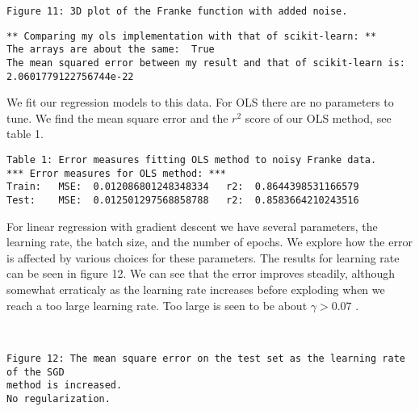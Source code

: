 \documentclass[11pt]{article}
\begin{document}
    \begin{Verbatim}[commandchars=\\\{\}]
Figure 11: 3D plot of the Franke function with added noise.
    \end{Verbatim}

    \begin{Verbatim}[commandchars=\\\{\}]
** Comparing my ols implementation with that of scikit-learn: **
The arrays are about the same:  True
The mean squared error between my result and that of scikit-learn is:
2.0601779122756744e-22
    \end{Verbatim}

    We fit our regression models to this data. For OLS there are no
parameters to tune. We find the mean square error and the \(r^2\) score
of our OLS method, see table 1.


    \begin{Verbatim}[commandchars=\\\{\}]
Table 1: Error measures fitting OLS method to noisy Franke data.
*** Error measures for OLS method: ***
Train:   MSE:  0.012086801248348334   r2:  0.8644398531166579
Test:    MSE:  0.012501297568858788   r2:  0.8583664210243516
    \end{Verbatim}

    For linear regression with gradient descent we have several parameters,
the learning rate, the batch size, and the number of epochs. We explore
how the error is affected by various choices for these parameters. The
results for learning rate can be seen in figure 12. We can see that the
error improves steadily, although somewhat erraticaly as the learning
rate increases before exploding when we reach a too large learning rate.
Too large is seen to be about \(\gamma>0.07\) .



    \begin{center}
    \end{center}
    { \hspace*{\fill} \\}
    
    \begin{Verbatim}[commandchars=\\\{\}]
Figure 12: The mean square error on the test set as the learning rate of the SGD
method is increased.
No regularization.
    \end{Verbatim}
\end{document}
